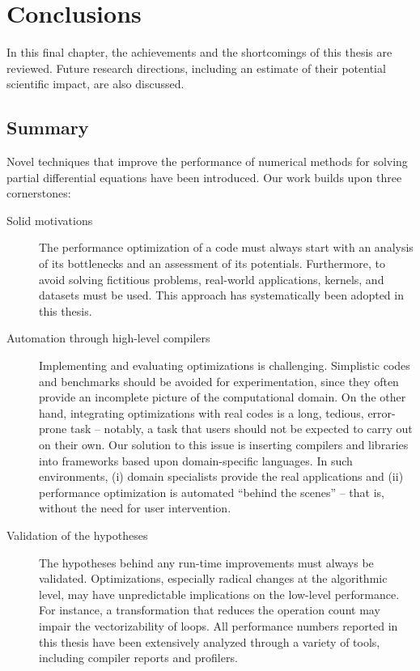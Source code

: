 \chapter{Conclusions}
In this final chapter, the achievements and the shortcomings of this thesis are reviewed. Future research directions, including an estimate of their potential scientific impact, are also discussed. 

\section{Summary}
Novel techniques that improve the performance of numerical methods for solving partial differential equations have been introduced. Our work builds upon three cornerstones:

\begin{description} 
\item[Solid motivations] The performance optimization of a code must always start with an analysis of its bottlenecks and an assessment of its potentials. Furthermore, to avoid solving fictitious problems, real-world applications, kernels, and datasets must be used. This approach has systematically been adopted in this thesis.
\item[Automation through high-level compilers] Implementing and evaluating optimizations is challenging. Simplistic codes and benchmarks should be avoided for experimentation, since they often provide an incomplete picture of the computational domain. On the other hand, integrating optimizations with real codes is a long, tedious, error-prone task -- notably, a task that users should not be expected to carry out on their own. Our solution to this issue is inserting compilers and libraries into frameworks based upon domain-specific languages. In such environments, (i) domain specialists provide the real applications and (ii) performance optimization is automated ``behind the scenes'' -- that is, without the need for user intervention.
\item[Validation of the hypotheses] The hypotheses behind any run-time improvements must always be validated. Optimizations, especially radical changes at the algorithmic level, may have unpredictable implications on the low-level performance. For instance, a transformation that reduces the operation count may impair the vectorizability of loops. All performance numbers reported in this thesis have been extensively analyzed through a variety of tools, including compiler reports and profilers. 
\end{description}

